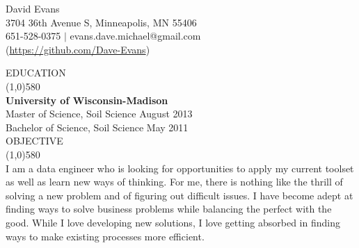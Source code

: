 \documentclass{article}
\begin{document}
\begin{centering}   
\Huge{David Evans} \\
\large{  3704 36th Avenue S, Minneapolis, MN 55406 \\
651-528-0375 $|$ evans.dave.michael@gmail.com} \\
(\href{https://github.com/Dave-Evans}{https://github.com/Dave-Evans}) \\ 
\bigskip

\onehalfspacing
\end{centering}
\noindent \large{EDUCATION}\\
\line(1,0){580}\\ \normalsize
\textbf{University of Wisconsin-Madison}\\
Master of Science, Soil Science \hfill August 2013\\ %
\noindent Bachelor of Science, Soil Science \hfill May 2011\\ %

\noindent \large{OBJECTIVE}\\
\line(1,0){580}\\
I am a data engineer who is looking for opportunities to apply my current toolset as well as learn new ways of thinking.
For me, there is nothing like the thrill of solving a new problem and of figuring out difficult issues.
I have become adept at finding ways to solve business problems while balancing the perfect with the good.
While I love developing new solutions, I love getting absorbed in finding ways to make existing processes more efficient. \\
\end{document}
